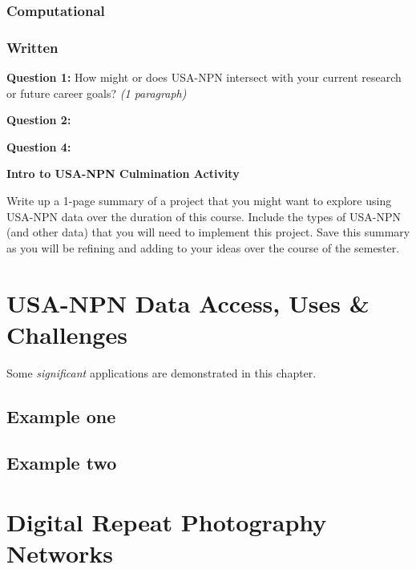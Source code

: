 \documentclass[]{book}
\begin{document}
\hypertarget{computational}{%
\subsection{Computational}\label{computational}}

\hypertarget{ds-challenge}{}
\hypertarget{written}{%
\subsection{Written}\label{written}}

\textbf{Question 1:} How might or does USA-NPN
intersect with your current research or future career goals? \emph{(1 paragraph)}

\textbf{Question 2:}

\textbf{Question 4:}

\textbf{Intro to USA-NPN Culmination Activity}

Write up a 1-page summary of a project that you might want to explore using USA-NPN data over the duration of this course. Include the types of USA-NPN (and other data) that you will need to implement this project. Save this summary as you will be refining and adding to your ideas over the course of the semester.

\hypertarget{usa-npn-data-access-uses-challenges}{%
\chapter{USA-NPN Data Access, Uses \& Challenges}\label{usa-npn-data-access-uses-challenges}}

Some \emph{significant} applications are demonstrated in this chapter.

\hypertarget{example-one}{%
\section{Example one}\label{example-one}}

\hypertarget{example-two}{%
\section{Example two}\label{example-two}}

\hypertarget{digital-repeat-photography-networks}{%
\chapter{Digital Repeat Photography Networks}\label{digital-repeat-photography-networks}}
\end{document}
